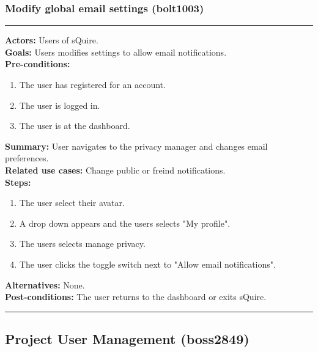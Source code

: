 \documentclass[11pt]{report}
\begin{document}
\subsubsection{Modify global email settings (bolt1003)}
\vspace{2pt}
\hrule
\vspace{8pt}
 \textbf{Actors:} Users of sQuire. \\ 
 \textbf{Goals:} Users modifies settings to allow email notifications. \\
 \textbf{Pre-conditions:} \begin{enumerate}
  \item The user has registered for an account.
  \item The user is logged in.
  \item The user is at the dashboard.
 \end{enumerate}
 \textbf{Summary:} User navigates to the privacy manager and changes email preferences.\\ 
 \textbf{Related use cases:} Change public or freind notifications. \\ 
 \textbf{Steps:} \begin{enumerate}
  \item The user select their avatar.
  \item A drop down appears and the users selects "My profile".
  \item The users selects manage privacy.
  \item The user clicks the toggle switch next to "Allow email notifications".
 \end{enumerate}
 \textbf{Alternatives:} None. \\
 \textbf{Post-conditions:} The user returns to the dashboard or exits sQuire. \\
 \vspace{8pt}
\hrule
\newpage
\subsection{Project User Management (boss2849)}
\end{document}
